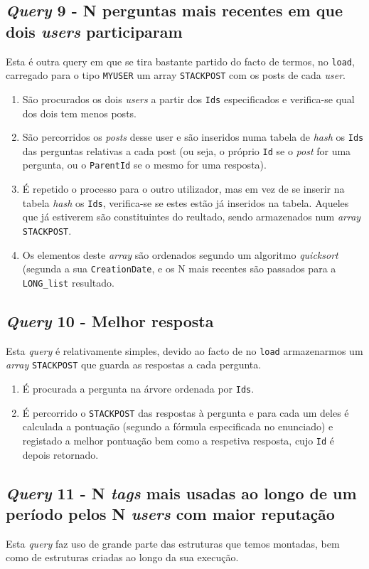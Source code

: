 \documentclass[10pt]{article}
\begin{document}
	\subsection*{\textit{Query} 9 - N perguntas mais recentes em que dois \textit{users} participaram}
			Esta é outra query em que se tira bastante partido do facto de termos, no \texttt{load},
		carregado para o tipo \texttt{MYUSER} um array \texttt{STACKPOST} com os posts de cada
		\textit{user}.
			\begin{enumerate}
				\item São procurados os dois \textit{users} a partir dos \texttt{Ids} especificados e verifica-se qual dos dois tem menos posts.
				\item São percorridos os \textit{posts} desse user e são inseridos numa tabela
de \textit{hash} os \texttt{Ids} das perguntas relativas a cada post (ou seja, o próprio
\texttt{Id} se o \textit{post} for uma pergunta, ou o \texttt{ParentId} se o mesmo for uma
resposta).
				\item É repetido o processo para o outro utilizador, mas em vez de se inserir
na tabela \textit{hash} os \texttt{Ids}, verifica-se se estes estão já inseridos na tabela.
Aqueles que já estiverem são constituintes do reultado, sendo armazenados num \textit{array}
\texttt{STACKPOST}.
				\item Os elementos deste \textit{array} são ordenados segundo um algoritmo
\textit{quicksort} (segunda a sua \texttt{CreationDate}, e os N mais recentes são passados
para a \texttt{LONG\_list} resultado.
			\end{enumerate}
	\subsection*{\textit{Query} 10 - Melhor resposta}
			Esta \textit{query} é relativamente simples, devido ao facto de no \texttt{load} 
			armazenarmos um \textit{array} \texttt{STACKPOST} que guarda as respostas a cada 
			pergunta.
			\begin{enumerate}
				\item É procurada a pergunta na árvore ordenada por \texttt{Ids}.
				\item É percorrido o \texttt{STACKPOST} das respostas à pergunta e para cada
					um deles é calculada a pontuação (segundo a fórmula especificada no enunciado)
					e registado a melhor pontuação bem como a respetiva resposta, cujo \texttt{Id}
					é depois retornado. 
			\end{enumerate}
	\subsection*{\textit{Query} 11 - N \textit{tags} mais usadas ao longo de um período pelos N \textit{users} com maior reputação}
			Esta \textit{query} faz uso de grande parte das estruturas que temos montadas, bem
		como de estruturas criadas ao longo da sua execução.
		
\end{document}
